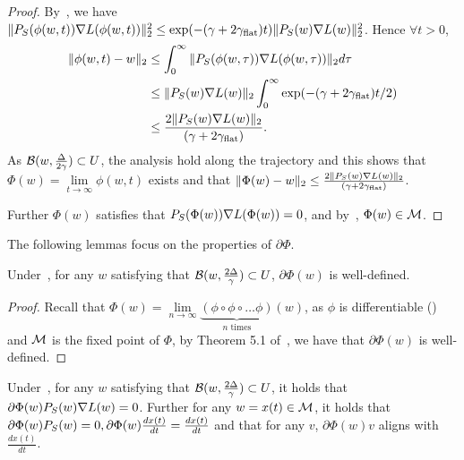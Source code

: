 \begin{proof}
By~, we have $\|{P}_S(\phi(w,t)) \nabla L(\phi(w,t)) \|_2^2 \le \exp(-(\gamma + 2 \gamma_{\mathrm{flat}})t) \| {P}_S(w) \nabla L(w) \|_2^2$.
Hence $\forall t > 0$,
\begin{align*}
\| \phi(w, t) - w \|_2 &\le \int_{0}^{\infty} \| {P}_S(\phi(w,\tau)) \nabla L(\phi(w, \tau)) \|_2 d \tau \\
&\le \| {P}_S(w) \nabla L(w) \|_2 \int_{0}^{\infty} \exp(-(\gamma + 2 \gamma_{\mathrm{flat}})t/2)  \\
&\le \frac{2 \| {P}_S(w) \nabla L(w) \|_2}{(\gamma + 2 \gamma_{\mathrm{flat}})}.
\end{align*}
As $\mathcal{B}(w, \frac{\Delta}{2 \gamma}) \subset U$, the analysis hold along the trajectory and this shows that $\Phi(w) = \lim\limits_{t \to \infty} \phi(w, t)$ exists and that $\| \Phi(w) - w \|_2 \le  \frac{2 \| {P}_S(w) \nabla L(w) \|_2}{(\gamma + 2 \gamma_{\mathrm{flat}})}$.

Further $\Phi(w)$ satisfies that ${P}_S(\Phi(w)) \nabla L(\Phi(w)) = 0$, and by~, $\Phi(w) \in \mathcal{M}$.  
\end{proof}


The following lemmas focus on the properties of $\partial \Phi$.

\begin{lemma}
\label{lem:partialphiexists}
Under~, for any $w$ satisfying that $\mathcal{B}(w, \frac{2 \Delta}{\gamma}) \subset U$, $\partial \Phi(w)$ is well-defined. 
\end{lemma}

\begin{proof}
Recall that $\Phi(w) = \lim\limits_{n \to \infty} \underbrace{(\phi \circ \phi \circ \ldots \phi)}_{n \text{ times}}(w)$, as $\phi$ is differentiable () and $\mathcal{M}$ is the fixed point of $\Phi$, by Theorem 5.1 of~\cite{Falconer1983}, we have that $\partial \Phi(w)$ is well-defined.
\end{proof}

\begin{lemma}
\label{lem:partialphi}
Under~, for any $w$ satisfying that $\mathcal{B}(w, \frac{2 \Delta}{\gamma}) \subset U$,  it holds that $\partial \Phi(w) {P}_S(w) \nabla L(w) = 0$. Further for any $w = x(t) \in \mathcal{M}$, it holds that $\partial \Phi(w) {P}_S(w) = 0, \partial \Phi(w) \frac{d x(t)}{dt} = \frac{d x(t)}{dt}$ and that for any $v$, $\partial \Phi(w) v$ aligns with $\frac{d x(t)}{dt}$.
\end{lemma}

